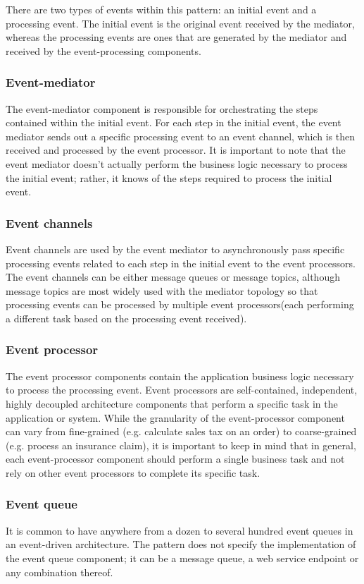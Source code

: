 There are two types of events within this pattern: an initial event and a processing event. The initial event is the original event received by the mediator, whereas the processing events are ones that are generated by the mediator and received by the event-processing components.

\subsubsection{Event-mediator}
The event-mediator component is responsible for orchestrating the steps contained within the initial event. For each step in the initial event, the event mediator sends out a specific processing event to an event channel, which is then received and processed by the event processor. It is important to note that the event mediator doesn't actually perform the business logic necessary to process the initial event; rather, it knows of the steps required to process the initial event.

\subsubsection{Event channels}
Event channels are used by the event mediator to asynchronously pass specific processing events related to each step in the initial event to the event processors. The event channels can be either message queues or message topics, although message topics are most widely used with the mediator topology so that processing events can be processed by multiple event processors(each performing a different task based on the processing event received).

\subsubsection{Event processor}
The event processor components contain the application business logic necessary to process the processing event. Event processors are self-contained, independent, highly decoupled architecture components that perform a specific task in the application or system. While the granularity of the event-processor component can vary from fine-grained (e.g. calculate sales tax on an order) to coarse-grained (e.g. process an insurance claim), it is important to keep in mind that in general, each event-processor component should perform a single business task and not rely on other event processors to complete its specific task.

\subsubsection{Event queue}
It is common to have anywhere from a dozen to several hundred event queues in an event-driven architecture. The pattern does not specify the implementation of the event queue component; it can be a message queue, a web service endpoint or any combination thereof.

